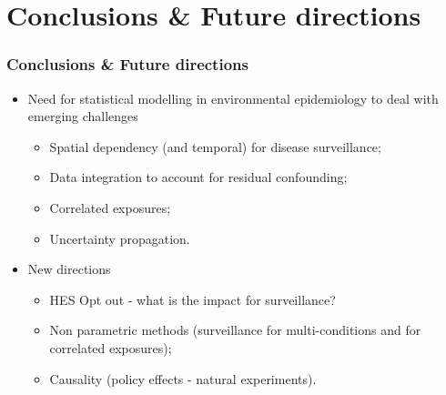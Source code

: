 \documentclass[slidestop,compress,serif,10pt]{beamer}
\begin{document}
\section{Conclusions \& Future directions}
\begin{frame}\frametitle{Conclusions \& Future directions}
\begin{itemize}
\vfill\item Need for statistical modelling in environmental epidemiology to deal with emerging challenges
\begin{itemize}
\vfill\item Spatial dependency (and temporal) for disease surveillance;
\vfill\item Data integration to account for residual confounding;
\vfill\item Correlated exposures;
\vfill\item Uncertainty propagation.
\end{itemize}

\vfill\item New directions
\begin{itemize}
\vfill\item HES Opt out - what is the impact for surveillance?
\vfill\item Non parametric methods (surveillance for multi-conditions and for correlated exposures);
\vfill\item Causality (policy effects - natural experiments).
\end{itemize}
\end{itemize}
\end{frame}
\end{document}
